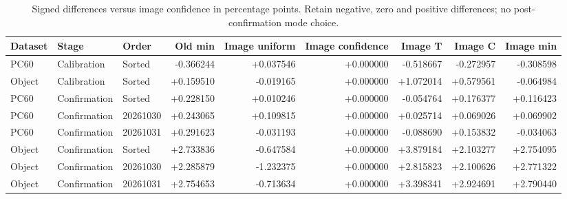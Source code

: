 \begin{table}[t]
\caption{Signed differences versus image confidence in percentage points. Retain negative, zero and positive differences; no post-confirmation mode choice.}
\centering\scriptsize
\begin{tabular}{@{}lllrrrrrr@{}}
\toprule
Dataset & Stage & Order & Old min & Image uniform & Image confidence & Image T & Image C & Image min \\
\midrule
PC60 & Calibration & Sorted & -0.366244 & +0.037546 & +0.000000 & -0.518667 & -0.272957 & -0.308598 \\
Object & Calibration & Sorted & +0.159510 & -0.019165 & +0.000000 & +1.072014 & +0.579561 & -0.064984 \\
PC60 & Confirmation & Sorted & +0.228150 & +0.010246 & +0.000000 & -0.054764 & +0.176377 & +0.116423 \\
PC60 & Confirmation & 20261030 & +0.243065 & +0.109815 & +0.000000 & +0.025714 & +0.069026 & +0.069902 \\
PC60 & Confirmation & 20261031 & +0.291623 & -0.031193 & +0.000000 & -0.088690 & +0.153832 & -0.034063 \\
Object & Confirmation & Sorted & +2.733836 & -0.647584 & +0.000000 & +3.879184 & +2.103277 & +2.754095 \\
Object & Confirmation & 20261030 & +2.285879 & -1.232375 & +0.000000 & +2.815823 & +2.100626 & +2.771322 \\
Object & Confirmation & 20261031 & +2.754653 & -0.713634 & +0.000000 & +3.398341 & +2.924691 & +2.790440 \\
\bottomrule
\end{tabular}
\end{table}
